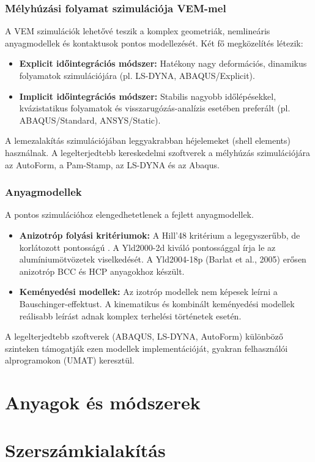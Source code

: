 \documentclass[12pt,a4paper,oneside]{report}
\begin{document}
\subsection{Mélyhúzási folyamat szimulációja VEM-mel}
A VEM szimulációk lehetővé teszik a komplex geometriák, nemlineáris anyagmodellek és kontaktusok pontos modellezését. Két fő megközelítés létezik:
\begin{itemize}
    \item \textbf{Explicit időintegrációs módszer:} Hatékony nagy deformációs, dinamikus folyamatok szimulációjára (pl. LS-DYNA, ABAQUS/Explicit).
    \item \textbf{Implicit időintegrációs módszer:} Stabilis nagyobb időlépésekkel, kvázistatikus folyamatok és visszarugózás-analízis esetében preferált (pl. ABAQUS/Standard, ANSYS/Static).
\end{itemize}
A lemezalakítás szimulációjában leggyakrabban héjelemeket (shell elements) használnak. A legelterjedtebb kereskedelmi szoftverek a mélyhúzás szimulációjára az AutoForm, a Pam-Stamp, az LS-DYNA és az Abaqus.

\subsection{Anyagmodellek}
A pontos szimulációhoz elengedhetetlenek a fejlett anyagmodellek.
\begin{itemize}
    \item \textbf{Anizotróp folyási kritériumok:} A Hill'48 kritérium a legegyszerűbb, de korlátozott pontosságú \cite{Mu2022}. A Yld2000-2d \cite{Barlat2003} kiváló pontossággal írja le az alumíniumötvözetek viselkedését. A Yld2004-18p (Barlat et al., 2005) erősen anizotróp BCC és HCP anyagokhoz készült.
    \item \textbf{Keményedési modellek:} Az izotróp modellek nem képesek leírni a Bauschinger-effektust. A kinematikus és kombinált keményedési modellek reálisabb leírást adnak komplex terhelési történetek esetén.
\end{itemize}
A legelterjedtebb szoftverek (ABAQUS, LS-DYNA, AutoForm) különböző szinteken támogatják ezen modellek implementációját, gyakran felhasználói alprogramokon (UMAT) keresztül.

\chapter{Anyagok és módszerek}

\chapter{Szerszámkialakítás}
\end{document}
